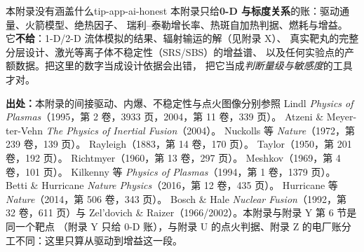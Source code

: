 \begin{tip}{本附录没有涵盖什么}{tip-app-ai-honest}
本附录只给\textbf{0-D 与标度关系}的账：驱动通量、火箭模型、绝热因子、
瑞利--泰勒增长率、热斑自加热判据、燃耗与增益。
它\textbf{不给}：1-D/2-D 流体模拟的结果、辐射输运的解（见附录 X）、
真实靶丸的完整分层设计、激光等离子体不稳定性（SRS/SBS）的增益谱、
以及任何实验点的产额数据。把这里的数字当成设计依据会出错，
把它当成\emph{判断量级与敏感度}的工具才对。
\end{tip}

\textbf{出处：}本附录的间接驱动、内爆、不稳定性与点火图像分别参照
Lindl \emph{Physics of Plasmas}（1995，第 2 卷，3933 页，2004，第 11 卷，339 页）。
Atzeni \& Meyer-ter-Vehn \emph{The Physics of Inertial Fusion}（2004）。
Nuckolls 等 \emph{Nature}（1972，第 239 卷，139 页）。
Rayleigh（1883，第 14 卷，170 页）。
Taylor（1950，第 201 卷，192 页）。
Richtmyer（1960，第 13 卷，297 页）。
Meshkov（1969，第 4 卷，101 页）。
Kilkenny 等 \emph{Physics of Plasmas}（1994，第 1 卷，1379 页）。
Betti \& Hurricane \emph{Nature Physics}（2016，第 12 卷，435 页）。
Hurricane 等 \emph{Nature}（2014，第 506 卷，343 页）。
Bosch \& Hale \emph{Nuclear Fusion}（1992，第 32 卷，611 页）与
Zel'dovich \& Raizer（1966/2002）。本附录与附录 Y 第 6 节是同一个靶点
（附录 Y 只给 0-D 账），与附录 U 的点火判据、附录 Z 的电厂账分工不同：这里只算从驱动到增益这一段。
\endgroup